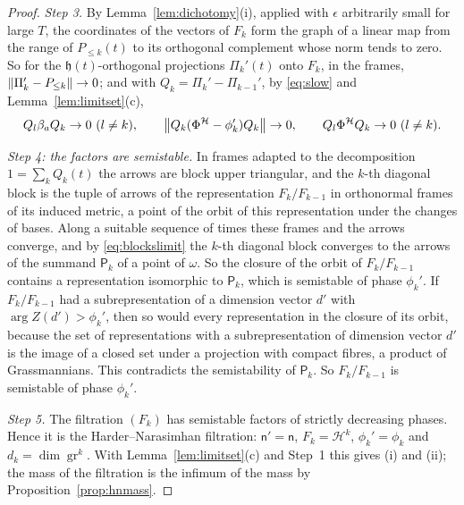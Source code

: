 \begin{proof}
\emph{Step 3.} By Lemma~\ref{lem:dichotomy}(i), applied with $\epsilon$
arbitrarily small for large $T$, the coordinates of the vectors of $F_k$
form the graph of a linear map from the range of $P_{\leq k}(t)$ to its
orthogonal complement whose norm tends to zero. So for the
$\mathfrak h(t)$-orthogonal projections $\Pi_k'(t)$ onto $F_k$, in the
frames, $\left\lVert\Pi_k'-P_{\leq k}\right\rVert\to0$; and with
$Q_k=\Pi_k'-\Pi_{k-1}'$, by \eqref{eq:slow} and Lemma~\ref{lem:limitset}(c),
\begin{equation}\label{eq:blockslimit}
 Q_l\beta_aQ_k\to0\ (l\neq k),\qquad
 \left\lVert Q_k(\Phi^{\mathcal H}-\phi_k')Q_k\right\rVert\to0,\qquad
 Q_l\Phi^{\mathcal H}Q_k\to0\ (l\neq k).
\end{equation}

\emph{Step 4: the factors are semistable.} In frames adapted to the
decomposition $1=\sum_kQ_k(t)$ the arrows are block upper triangular, and the
$k$-th diagonal block is the tuple of arrows of the representation
$F_k/F_{k-1}$ in orthonormal frames of its induced metric, a point of the
orbit of this representation under the changes of bases. Along a suitable
sequence of times these frames and the arrows converge, and by
\eqref{eq:blockslimit} the $k$-th diagonal block converges to the arrows of
the summand $\mathsf P_k$ of a point of $\omega$. So the closure of the orbit
of $F_k/F_{k-1}$ contains a representation isomorphic to $\mathsf P_k$, which
is semistable of phase $\phi_k'$. If $F_k/F_{k-1}$ had a subrepresentation
of a dimension vector $d'$ with $\arg Z(d')>\phi_k'$, then so would every
representation in the closure of its orbit, because the set of
representations with a subrepresentation of dimension vector $d'$ is the
image of a closed set under a projection with compact fibres, a product of
Grassmannians. This contradicts the semistability of $\mathsf P_k$. So
$F_k/F_{k-1}$ is semistable of phase $\phi_k'$.

\emph{Step 5.} The filtration $(F_k)$ has semistable factors of strictly
decreasing phases. Hence it is the Harder--Narasimhan filtration:
$\mathsf n'=\mathsf n$, $F_k=\mathcal H^k$, $\phi_k'=\phi_k$ and
$d_k=\dim\operatorname{gr}^k$. With Lemma~\ref{lem:limitset}(c) and Step~1
this gives (i) and (ii); the mass of the filtration is the infimum of the
mass by Proposition~\ref{prop:hnmass}.


\end{proof}
